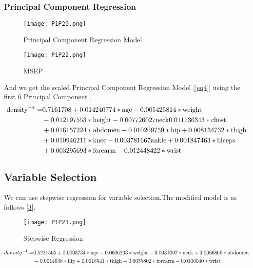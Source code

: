 \documentclass[11pt]{article}
\begin{document}
\subsubsection{Principal Component Regression}

\begin{figure}[!htb]
\centering
\texttt{[image: P1P20.png]}
\caption{Principal Component Regression Model}\label{Fig17}
\end{figure}

\begin{figure}[!htb]
\centering
\texttt{[image: P1P22.png]}
\caption{MSEP}\label{Fig19}
\end{figure}

And we get the scaled Principal Component Regression Model [\ref{eq4}] using the first 6 Principal Component
     ,    
\begin{align}
	\text{density}^{-4} = &0.7161708+ 0.014240774 *\text{age}-0.005425814 *\text{weight}\notag\\
	& -0.012197553*\text{height} -0.007726027\text{neck}0.011736343*\text{chest}\notag\\
	&+0.016157224*\text{abdomen}+0.010209759*\text{hip}+0.008134732*\text{thigh}\notag \\ 
    &+0.010946211*\text{knee} -0.003781667\text{ankle}+0.001847463*\text{biceps}\notag\\
    & +0.003295693*\text{forearm}-0.012448422*\text{wrist}\label{eq4}  
\end{align}



\subsection{Variable Selection}\label{ch6}

We can use stepwise regression for variable selection.The modified model is as follows [\ref{Fig18}].
\begin{figure}[!htb]
\centering
\texttt{[image: P1P21.png]}
\caption{Stepwise Regression}\label{Fig18}
\end{figure}
                       
\begin{align}
density^{-4} = &0.5221505+0.0003734*\text{age}-0.0006203*\text{weight}-0.0031002*\text{neck}+0.0066866*\text{abdomen}\notag\\&-0.0014038*\text{hip}+0.0018541*\text{thigh}+0.0035802*\text{forearm}-0.0106040*\text{wrist}\label{eq5}
\end{align}
\end{document}
